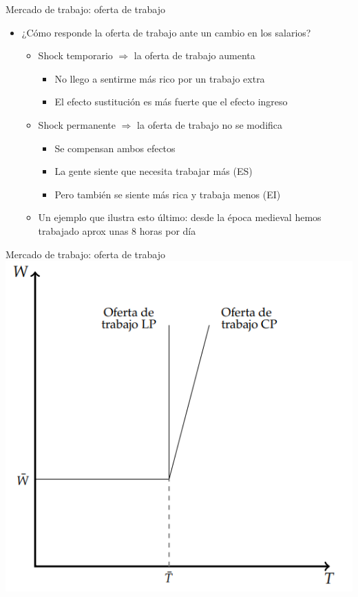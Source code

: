 \documentclass{beamer}
\begin{document}
\begin{frame}{Mercado de trabajo: oferta de trabajo}
    \begin{itemize}
        \item ¿Cómo responde la oferta de trabajo ante un cambio en los salarios?
        \begin{itemize}
            \item Shock temporario $\Rightarrow$ la oferta de trabajo aumenta
            \begin{itemize}
                \item No llego a sentirme más rico por un trabajo extra
                \item El efecto sustitución es más fuerte que el efecto ingreso
            \end{itemize}
            \item Shock permanente $\Rightarrow$ la oferta de trabajo no se modifica
            \begin{itemize}
                \item Se compensan ambos efectos
                \item La gente siente que necesita trabajar más (ES) 
                \item Pero también se siente más rica y trabaja menos (EI)
            \end{itemize}
            \item Un ejemplo que ilustra esto último: desde la época medieval hemos trabajado aprox unas 8 horas por día
        \end{itemize}
    \end{itemize}
\end{frame}

\begin{frame}{Mercado de trabajo: oferta de trabajo}
    \centering
    \includegraphics[scale=0.6]{../Figures/C34.4.png}
\end{frame}
\end{document}
